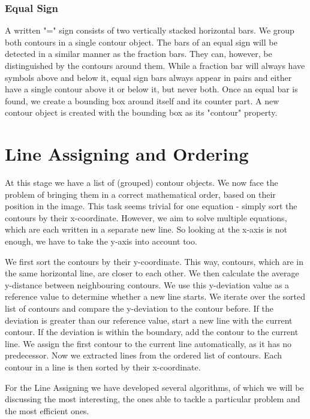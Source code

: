 \documentclass[12pt]{article}
\begin{document}
\begin{itemize}
\begin{itemize}
\begin{itemize}
\begin{itemize}
\begin{itemize}
\begin{itemize}
\begin{itemize}
\begin{itemize}
\begin{itemize}
\begin{itemize}
	\subsubsection{Equal Sign}
	A written "=" sign consists of two vertically stacked horizontal bars. We group both contours in a single contour object.
	The bars of an equal sign will be detected in a similar manner as the fraction bars.
	They can, however, be distinguished by the contours around them.
	While a fraction bar will always have symbols above and below it, equal sign bars always appear in pairs
	and either have a single contour above it or below it, but never both.
	Once an equal bar is found, we create a bounding box around itself and its counter part.
	A new contour object is created with the bounding box as its "contour" property.


\section{Line Assigning and Ordering}
	At this stage we have a list of (grouped) contour objects. We now face the problem of bringing them in a correct mathematical order, based on their position in the image.
	This task seems trivial for one equation - simply sort the contours by their x-coordinate.
	However, we aim to solve multiple equations, which are each written in a separate new line.
	So looking at the x-axis is not enough, we have to take the y-axis into account too.

	We first sort the contours by their y-coordinate. This way, contours, which are in the same horizontal line, are closer to each other.
	We then calculate the average y-distance between neighbouring contours. We use this y-deviation value as a reference value to determine whether a new line starts.
	We iterate over the sorted list of contours and compare the y-deviation to the contour before. If the deviation is greater than our reference value,
	start a new line with the current contour. If the deviation is within the boundary, add the contour to the current line.
	We assign the first contour to the current line automatically, as it has no predecessor.
	Now we extracted lines from the ordered list of contours. Each contour in a line is then sorted by their x-coordinate.

	For the Line Assigning we have developed several algorithms, of which we will be discussing the most interesting, the ones able to tackle a particular problem and the most efficient ones.


\end{itemize}
\end{itemize}
\end{itemize}
\end{itemize}
\end{itemize}
\end{itemize}
\end{itemize}
\end{itemize}
\end{itemize}
\end{itemize}
\end{document}
